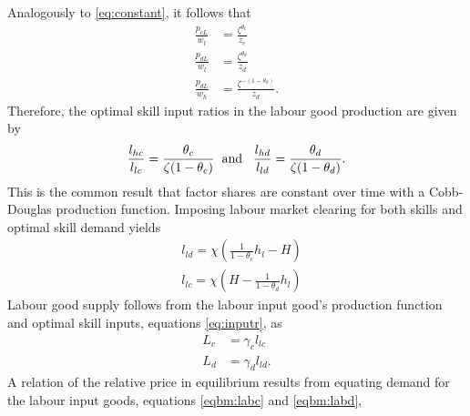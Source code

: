 Analogously to \ref{eq:constant}, it follows that
\begin{align}
	\frac{p_{cL}}{w_l}&=\frac{\zeta^{\theta_c}}{z_c}\label{eq:pcl_wl}\\
	\frac{p_{dL}}{w_l}&=\frac{\zeta^{\theta_d}}{z_d}%
	\label{eq:pdl_wl}\\
	\frac{p_{dL}}{w_h}&=\frac{\zeta^{-(1-\theta_d)}}{z_d}.
\end{align}
Therefore, the optimal skill input ratios in the labour good production are given by
\begin{align}\label{eq:inputr}
	\frac{l_{hc}}{l_{lc}}=\frac{\theta_c}{\zeta (1-\theta_c)} \hspace{2mm} \text{and}\hspace{3mm} \frac{l_{hd}}{l_{ld}}=\frac{\theta_d}{\zeta (1-\theta_d)}.
\end{align}
This is the common result that  factor shares 
are constant over time with a Cobb-Douglas production function. 
Imposing labour market clearing for both skills and optimal skill demand yields 
\begin{align}
	&l_{ld}=\chi\left(\frac{1}{1-\theta_c}h_l-H\right)\label{eq:lld}\\ %
	& l_{lc}=\chi \left(H-\frac{1}{1-\theta_d}h_l\right)\label{eq:llc} %
\end{align}
Labour good supply follows from the labour input good's production function and optimal skill inputs, equations \ref{eq:inputr}, as
\begin{align}
	L_c&=\gamma_cl_{lc}\label{eq:lab_inputc} \\
	L_d&=\gamma_dl_{ld}.\label{eq:lab_inputd}
\end{align}
A relation of the relative price in equilibrium results from equating demand for the labour input goods, equations \ref{eqbm:labc} and \ref{eqbm:labd}, %
